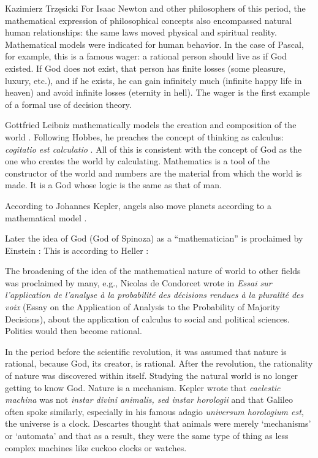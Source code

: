 \begin{artengenv}{Kazimierz Trzęsicki}
For Isaac Newton and other philosophers of this period, the mathematical expression of philosophical concepts also encompassed natural human relationships: the same laws moved physical and spiritual reality. Mathematical models were indicated for human behavior. In the case of Pascal, for example, this is a famous wager: a rational person should live as if God existed. If God does not exist, that person has finite losses (some pleasure, luxury, etc.), and if he exists, he can gain infinitely much (infinite happy life in heaven) and avoid infinite losses (eternity in hell). The wager is the first example of a formal use of decision theory.

Gottfried Leibniz \parencite*{list1697,Leibniz1679} mathematically models the creation and composition of the world  \parencite{Trzesicki2006c,Trzesicki2006b,Trzesicki2020a}. Following Hobbes, he preaches the concept of thinking as calculus: \emph{cogitatio est calculatio} \parencite{Leibniz1666}. All of this is consistent with the concept of God as the one who creates the world by calculating. Mathematics is a tool of the constructor of the world and numbers are the material from which the world is made. It is a God whose logic is the same as that of man.

According to Johannes Kepler, angels also move planets according to a mathematical model \parencite{Donahue1993,Wolfson1962}.

Later the idea of God (God of Spinoza) as a ``mathematician'' is proclaimed by Einstein \parencite[p.279]{Infeld1980}:  This is according to Heller \parencite*[p.41]{Heller2014}: 

The broadening of the idea of the mathematical nature of world to other fields was proclaimed by many, e.g., Nicolas de Condorcet   wrote in \emph{Essai sur l’application de l’analyse à la probabilité des décisions rendues à la pluralité des voix} \parencite*{Condorcet1785} (Essay on the Application of Analysis to the Probability of Majority Decisions),  about the application of calculus to social and political sciences. Politics would then become rational.


In the period before the scientific revolution, it was assumed that nature is rational, because God, its creator, is rational. After the revolution, the rationality of nature was discovered within itself. Studying the natural world is no longer getting to know God. Nature is a mechanism. Kepler wrote that \emph{caelestic machina} was not \emph{instar divini animalis, sed instar horologii} and that Galileo often spoke similarly, especially in his famous adagio \emph{universum horologium est}, the universe is a clock. Descartes thought that animals were merely ‘mechanisms’ or ‘automata’ and that as a result, they were the same type of thing as less complex machines like cuckoo clocks or watches.


\end{artengenv}
